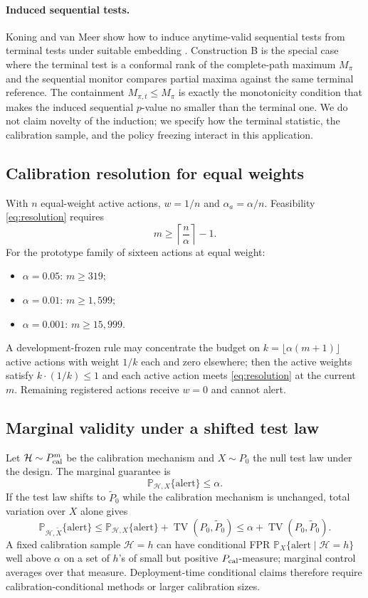 \documentclass[pdflatex,sn-mathphys-num]{sn-jnl}
\newcommand{\Prob}{\mathbb{P}}
\newcommand{\TV}{\operatorname{TV}}
\newcommand{\calH}{\mathcal{H}}
\begin{document}
\begin{appendices}
\paragraph*{Induced sequential tests.}
Koning and van Meer show how to induce anytime-valid sequential tests from terminal tests under suitable embedding \citep{koning2026anytime}. Construction B is the special case where the terminal test is a conformal rank of the complete-path maximum \(M_\pi\) and the sequential monitor compares partial maxima against the same terminal reference. The containment \(M_{\pi,t}\leq M_\pi\) is exactly the monotonicity condition that makes the induced sequential \(p\)-value no smaller than the terminal one. We do not claim novelty of the induction; we specify how the terminal statistic, the calibration sample, and the policy freezing interact in this application.

\subsection{Calibration resolution for equal weights}\label{app:resolution}

With \(n\) equal-weight active actions, \(w=1/n\) and \(\alpha_a=\alpha/n\). Feasibility \eqref{eq:resolution} requires
\[
 m\geq \left\lceil\frac{n}{\alpha}\right\rceil-1.
\]
For the prototype family of sixteen actions at equal weight:
\begin{itemize}
\item \(\alpha=0.05\): \(m\geq 319\);
\item \(\alpha=0.01\): \(m\geq 1{,}599\);
\item \(\alpha=0.001\): \(m\geq 15{,}999\).
\end{itemize}
A development-frozen rule may concentrate the budget on \(k=\lfloor\alpha(m+1)\rfloor\) active actions with weight \(1/k\) each and zero elsewhere; then the active weights satisfy \(k\cdot(1/k)\leq1\) and each active action meets \eqref{eq:resolution} at the current \(m\). Remaining registered actions receive \(w=0\) and cannot alert.

\subsection{Marginal validity under a shifted test law}\label{app:shift}

Let \(\calH\sim P_{\rm cal}^{m}\) be the calibration mechanism and \(X\sim P_0\) the null test law under the design. The marginal guarantee is
\[
 \Prob_{\calH,X}\{\text{alert}\}\leq\alpha.
\]
If the test law shifts to \(\widetilde P_0\) while the calibration mechanism is unchanged, total variation over \(X\) alone gives
\[
 \Prob_{\calH,\widetilde X}\{\text{alert}\}
 \leq \Prob_{\calH,X}\{\text{alert}\}+\TV(P_0,\widetilde P_0)
 \leq \alpha+\TV(P_0,\widetilde P_0).
\]
A fixed calibration sample \(\calH=h\) can have conditional FPR
\(\Prob_X\{\text{alert}\mid \calH=h\}\) well above \(\alpha\) on a set of \(h\)'s of small but positive \(P_{\rm cal}\)-measure; marginal control averages over that measure. Deployment-time conditional claims therefore require calibration-conditional methods \citep{bates2023} or larger calibration sizes.


\end{appendices}
\end{document}
